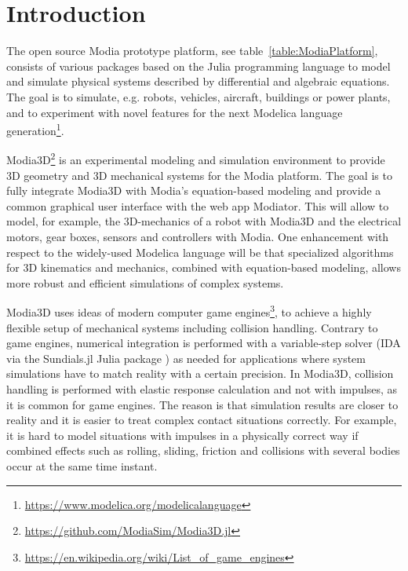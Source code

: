 \section{Introduction}

The open source Modia prototype platform, see table~\ref{table:ModiaPlatform}, consists of various packages
based on the Julia programming language \cite{bezanson2017julia} to model and simulate physical systems
described by differential and algebraic equations. The goal is
to simulate, e.g. robots, vehicles, aircraft, buildings or power plants,
and to experiment with novel features for the next Modelica\textsuperscript{\textcopyright} language
generation\footnote{\href{https://www.modelica.org/modelicalanguage}{https://www.modelica.org/modelicalanguage}}.

Modia3D\footnote{\href{https://github.com/ModiaSim/Modia3D.jl}{https://github.com/ModiaSim/Modia3D.jl}}
is an experimental modeling and simulation environment to provide 3D geometry and 3D mechanical systems
for the Modia platform. The goal is to fully integrate Modia3D with Modia's equation-based modeling and
provide a common graphical user interface with the web app Modiator. This will
allow to model, for example, the 3D-mechanics of a robot with Modia3D and the electrical motors, gear boxes,
sensors and controllers with Modia. One enhancement with respect to the widely-used Modelica language
will be that specialized algorithms for 3D kinematics and mechanics, combined with equation-based modeling,
allows more robust and efficient simulations of complex systems.

Modia3D uses ideas of modern computer
    game engines\footnote{\href{https://en.wikipedia.org/wiki/List_of_game_engines}{https://en.wikipedia.org/wiki/List\_of\_game\_engines}},
to achieve a highly flexible setup of mechanical systems including collision handling. 
Contrary to game engines, numerical integration is performed with a variable-step solver
(IDA via the Sundials.jl Julia package \cite{Sundials2005,Rackauckas2017}) as needed for applications
where system simulations have to match reality with a certain precision.
In Modia3D, collision handling is performed with elastic response calculation and not
with impulses, as it is common for game engines. The reason is that simulation results are closer to reality
and it is easier to treat complex contact situations correctly. For example, it is hard to model situations
with impulses in a physically correct way if combined effects such as rolling, sliding, friction and 
collisions with several bodies occur at the same time instant. 

